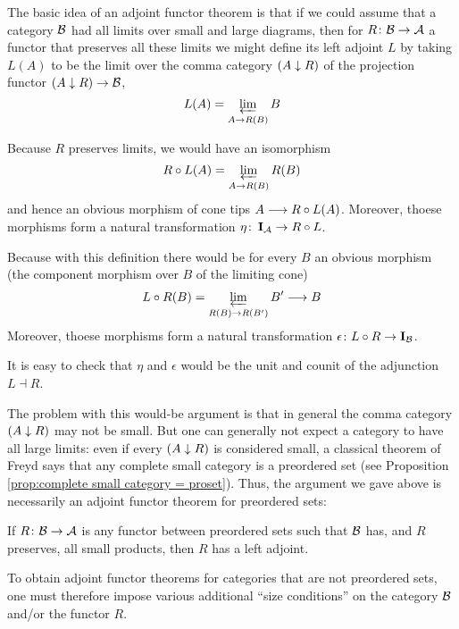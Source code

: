   The basic idea of an adjoint functor theorem is that if we could assume that a category ${\cal B}$ had all limits over small and large diagrams, then for $R\colon{\cal B}\to{\cal A}$ a functor that preserves all these limits we might define its left adjoint $L$ by taking $L(A)$ to be the limit over the comma category $(A\downarrow R)$ of the projection functor $(A\downarrow R)\to {\cal B}$,
  \begin{equation*}
    L(A)=\operatorname*{\underleftarrow{\lim}}_{A\to R(B)} B
  \end{equation*}

  Because $R$ preserves limits, we would have an isomorphism
  \begin{equation*}
    R\circ L(A)=\operatorname*{\underleftarrow{\lim}}_{A\to R(B)} R(B)
  \end{equation*}
  and hence an obvious morphism of cone tips $A\longrightarrow R\circ L(A)$. Moreover, thoese morphisms form a natural transformation $\eta\colon\operatorname{\mathbf{I}}_{{\cal A}} \to R \circ L$.

  Because with this definition there would be for every $B$ an obvious morphism (the component morphism over $B$ of the limiting cone)
  \begin{equation*}
    L\circ R(B)=\operatorname*{\underleftarrow{\lim}}_{R(B)\to R(B')} B' \longrightarrow B
  \end{equation*}
  Moreover, thoese morphisms form a natural transformation $\epsilon\colon L \circ R \to \operatorname{\mathbf{I}}_{{\cal B}}$.

  It is easy to check that $\eta$ and $\epsilon$ would be the unit and counit of the adjunction $L\dashv R$.

  The problem with this would-be argument is that in general the comma category $(A\downarrow R)$ may not be small. But one can generally not expect a category to have all large limits: even if every $(A\downarrow R)$ is considered small, a classical theorem of Freyd says that any complete small category is a preordered set (see Proposition \ref{prop:complete small category = proset}). Thus, the argument we gave above is necessarily an adjoint functor theorem for preordered sets:
  \begin{thm}
    If $R\colon{\cal B}\to{\cal A}$ is any functor between preordered sets such that ${\cal B}$ has, and $R$ preserves, all small products, then $R$ has a left adjoint.
  \end{thm}
  To obtain adjoint functor theorems for categories that are not preordered sets, one must therefore impose various additional ``size conditions'' on the category ${\cal B}$ and/or the functor $R$.

